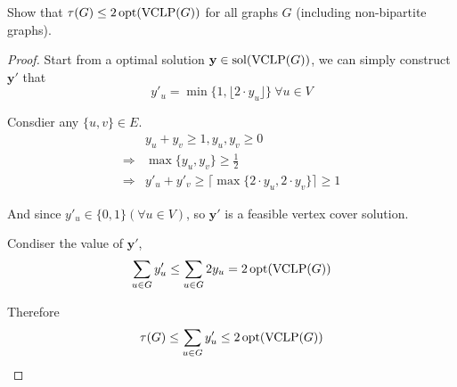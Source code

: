 \documentclass[11pt,a4paper,oneside]{article}
\newcommand{\y}{\mathbf{y}}
\newcommand{\sol}{\textup{\textrm{sol}}}
\newcommand{\opt}{\textup{\textrm{opt}}}
\begin{document}
\begin{problem}{3}
	\statement
     Show that $\tau(G) \leq 2\, \opt(\textrm{VCLP}(G))$ for all graphs $G$ (including non-bipartite graphs).
  
    \solution
    \begin{proof}
      Start from a optimal solution $\y \in \sol(\textrm{VCLP}(G))$, we can simply construct $\y'$ that 
      $$ y'_u = \min\{1,\lfloor 2 \cdot y_u \rfloor\} ~ \forall u \in V$$
      
      Consdier any $\{u, v\} \in E$.
      \begin{align*}
        &y_u + y_v \geq 1, y_u, y_v \geq 0 \\
      \Rightarrow& \max \{y_u, y_v\} \geq \frac 12 \\
      \Rightarrow& y'_u + y'_v \geq \lceil \max \{2\cdot y_u, 2\cdot y_v\} \rceil \geq 1\end{align*}
      
      And since $y'_u \in \{0, 1\} (\forall u \in V)$, so $\y'$ is a feasible vertex cover solution. 
      
      Condiser the value of $\y'$,
      $$ \sum_{u \in G}y'_u \leq \sum_{u \in G} 2y_u = 2\, \opt(\textrm{VCLP}(G))$$
      
      Therefore $$\tau(G) \leq \sum_{u \in G}y'_u \leq  2\, \opt(\textrm{VCLP}(G))$$
    
    \end{proof}
    
\end{problem}
\end{document}
